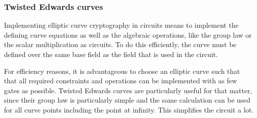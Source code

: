 \subsubsection{Twisted Edwards curves} Implementing elliptic curve cryptography in circuits means to implement the defining curve equations as well as the algebraic operations, like the group law or the scalar multiplication as circuits. To do this efficiently, the curve must be defined over the same base field as the field that is used in the circuit. 

For efficiency reasons, it is advantageous to choose an elliptic curve such that that all required constraints and operations can be implemented with as few gates as possible. Twisted Edwards curves are particularly useful for that matter, since their group law is particularly simple and the same calculation can be used for all curve points including the point at infinity. This simplifies the circuit a lot.
